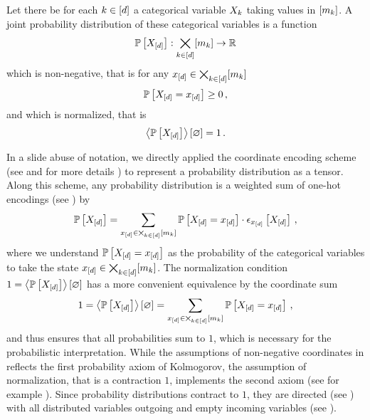 \begin{definition}
    \label{def:probabilityDistribution} %
    Let there be for each $k\in[d]$ a categorical variable $X_{k}$ taking values in $[m_{k}]$.
    A joint probability distribution of these categorical variables is a function
    \begin{align*}
        \mathbb{P}\left[X_{[d]}\right] : \bigtimes_{k\in[d]}[m_{k}] \rightarrow \mathbb{R}
    \end{align*}
    which is non-negative, that is for any $x_{[d]}\in\bigtimes_{k\in[d]}[m_{k}]$
    \begin{align*}
        \mathbb{P}\left[X_{[d]}=x_{[d]}\right] \geq 0 \, ,
    \end{align*}
    and which is normalized, that is
    \begin{align*}
        \left\langle \mathbb{P}\left[X_{[d]}\right]\right\rangle \left[ \varnothing \right] = 1 \, .
    \end{align*}
\end{definition}

In a slide abuse of notation, we directly applied the coordinate encoding scheme (see  and for more details ) to represent a probability distribution as a tensor.
Along this scheme, any probability distribution is a weighted sum of one-hot encodings (see ) by
\begin{align*} %
    \probwith = \sum_{\shortcatindices\in\facstates} \probat{\indexedshortcatvariables} \cdot \onehotmapofat{\shortcatindices}{\shortcatvariables} \, ,
\end{align*}
where we understand $\mathbb{P}\left[X_{[d]}=x_{[d]}\right]$ as the probability of the categorical variables to take the state $x_{[d]}\in\bigtimes_{k\in[d]}[m_{k}]$.
The normalization condition $1=\left\langle \mathbb{P}\left[X_{[d]}\right]\right\rangle \left[ \varnothing \right]$ has a more convenient equivalence by the coordinate sum
\begin{align*}
    1 = \left\langle \mathbb{P}\left[X_{[d]}\right]\right\rangle \left[ \varnothing \right]
    =  \sum_{x_{[d]}\in\bigtimes_{k\in[d]}[m_{k}]}\mathbb{P}\left[X_{[d]}=x_{[d]}\right] \, ,
\end{align*}
and thus ensures that all probabilities sum to $1$, which is necessary for the probabilistic interpretation.
While the assumptions of non-negative coordinates in  reflects the first probability axiom of Kolmogorov, the assumption of normalization, that is a contraction $1$, implements the second axiom (see for example \cite{degroot_probability_2016}).
Since probability distributions contract to $1$, they are directed (see ) with all distributed variables outgoing and empty incoming variables (see ).

